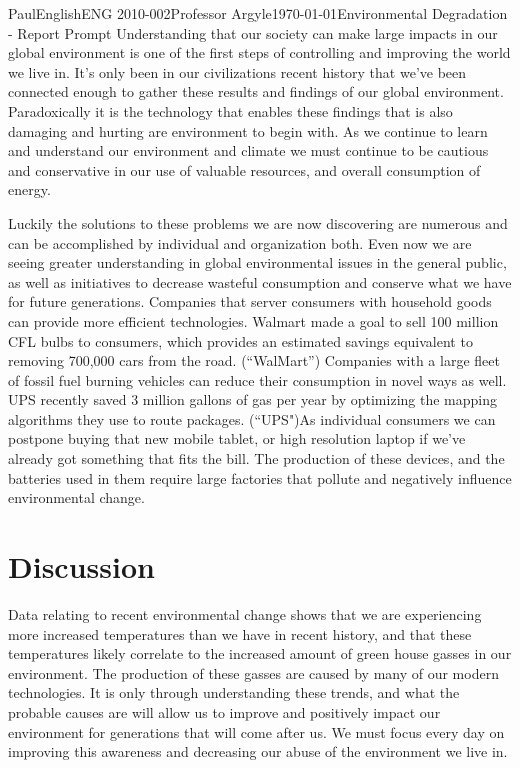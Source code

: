 \documentclass[12pt,letterpaper]{article}
\begin{document}
\begin{mla}{Paul}{English}{ENG 2010-002}{Professor Argyle}{\today}{Environmental Degradation - Report Prompt}
Understanding that our society can make large impacts in our global environment is one of the first steps of controlling and improving the world we live in. It's only been in our civilizations recent history that we've been connected enough to gather these results and findings of our global environment. Paradoxically it is the technology that enables these findings that is also damaging and hurting are environment to begin with. As we continue to learn and understand our environment and climate we must continue to be cautious and conservative in our use of valuable resources, and overall consumption of energy.

Luckily the solutions to these problems we are now discovering are numerous and can be accomplished by individual and organization both. Even now we are seeing greater understanding in global environmental issues in the general public, as well as initiatives to decrease wasteful consumption and conserve what we have for future generations. Companies that server consumers with household goods can provide more efficient technologies. Walmart made a goal to sell 100 million CFL bulbs to consumers, which provides an estimated savings equivalent to removing 700,000 cars from the road. (``WalMart'') Companies with a large fleet of fossil fuel burning vehicles can reduce their consumption in novel ways as well. UPS recently saved 3 million gallons of gas per year by optimizing the mapping algorithms they use to route packages. (``UPS")As individual consumers we can postpone buying that new mobile tablet, or high resolution laptop if we've already got something that fits the bill. The production of these devices, and the batteries used in them require large factories that pollute and negatively influence environmental change.

\section{Discussion}
Data relating to recent environmental change shows that we are experiencing more increased temperatures than we have in recent history, and that these temperatures likely correlate to the increased amount of green house gasses in our environment. The production of these gasses are caused by many of our modern technologies. It is only through understanding these trends, and what the probable causes are will allow us to improve and positively impact our environment for generations that will come after us. We must focus every day on improving this awareness and decreasing our abuse of the environment we live in.


\end{mla}
\end{document}
